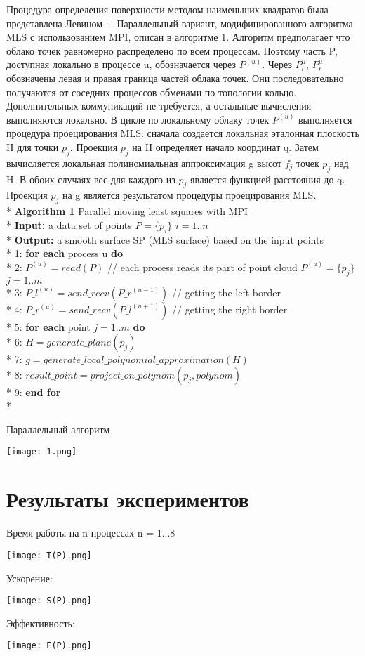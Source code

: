 Процедура определения поверхности методом наименьших квадратов была представлена Левином ~\cite{LEVIN}. Параллельный вариант, модифицированного алгоритма MLS с использованием MPI, описан в алгоритме 1. Алгоритм предполагает что облако точек равномерно распределено по всем процессам. Поэтому часть P, доступная локально в процессе u, обозначается через $P^{(u)}$. Через $P_l^{u}$, $P_r^{u}$ обозначены левая и правая граница частей облака точек. Они последовательно получаются от соседних процессов обменами по топологии кольцо. Дополнительных коммуникаций не требуется, а остальные вычисления выполняются локально. В цикле по локальному облаку точек $P^{(u)}$ выполняется процедура проецирования MLS: сначала создается локальная эталонная плоскость H для точки $p_j$. Проекция $p_j$ на H определяет начало координат q. Затем вычисляется локальная полиномиальная аппроксимация g высот $f_j$ точек $p_j$ над H. В обоих случаях вес для каждого из $p_j$ является функцией расстояния до q. Проекция $p_j$ на g является результатом процедуры проецирования MLS. \\*
\textbf{Algorithm 1}  Parallel moving least squares with MPI \\*
\textbf{Input:} a data set of points $P = \{p_i\}$ $i = 1..n$ \\*
\textbf{Output:} a smooth surface SP (MLS surface) based on the input
points \\*
1: \textbf{for each} process u \textbf{do} \\*
2: \quad $P^{(u)} = read(P)$ // each process reads its part of point cloud $P^{(u)} = \{p_j\}$ $j = 1..m$ \\*
3: \quad $P\_l^{(u)} = send\_recv(P\_r^{(u-1)})$ // getting the left border\\* 
4: \quad $P\_r^{(u)} = send\_recv(P\_l^{(u+1)})$ // getting the right border\\*
5: \quad\textbf{for each} point $j = 1..m $ \textbf{do}\\*
6: \quad\quad$H = generate\_plane(p_j)$ \\*
7: \quad\quad$g = generate\_local\_polynomial\_approximation(H)$ \\*
8: \quad\quad$result\_point = project\_on\_polynom(p_j, polynom)$ \\*
9: \quad\textbf{end for} \\*




Параллельный алгоритм

\texttt{[image: 1.png]}

\section{Результаты экспериментов}

Время работы на n процессах n = 1...8


\texttt{[image: T(P).png]}

Ускорение:

\texttt{[image: S(P).png]}

Эффективность:

\texttt{[image: E(P).png]}

